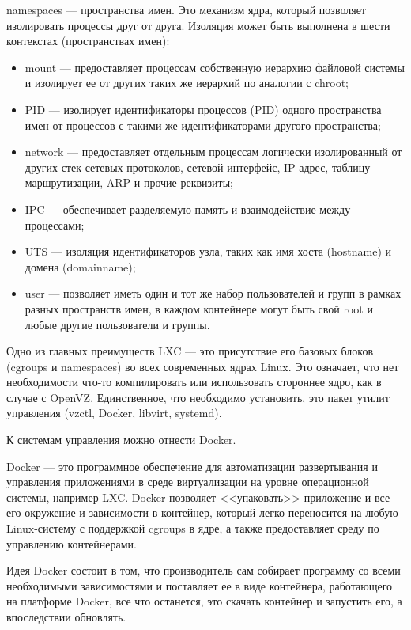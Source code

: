 namespaces --- пространства имен.
Это механизм ядра, который позволяет изолировать процессы друг от друга.
Изоляция может быть выполнена в шести контекстах (пространствах имен):
\begin{itemize}
  \item mount --- предоставляет процессам собственную иерархию файловой системы и изолирует ее от других таких же иерархий по аналогии с chroot;
  \item PID --- изолирует идентификаторы процессов (PID) одного пространства имен от процессов с такими же идентификаторами другого пространства;
  \item network --- предоставляет отдельным процессам логически изолированный от других стек сетевых протоколов, сетевой интерфейс, IP-адрес, таблицу маршрутизации, ARP и прочие реквизиты;
  \item IPC --- обеспечивает разделяемую память и взаимодействие между процессами;
  \item UTS --- изоляция идентификаторов узла, таких как имя хоста (hostname) и домена (domainname);
  \item user --- позволяет иметь один и тот же набор пользователей и групп в рамках разных пространств имен, в каждом контейнере могут быть свой root и любые другие пользователи и группы.
\end{itemize}

Одно из главных преимуществ LXC --- это присутствие его базовых блоков (cgroups и namespaces) во всех современных ядрах Linux.
Это означает, что нет необходимости что-то компилировать или использовать стороннее ядро, как в случае с OpenVZ.
Единственное, что необходимо установить, это пакет утилит управления (vzctl, Docker, libvirt, systemd).

К системам управления можно отнести Docker.

Docker --- это программное обеспечение для автоматизации развертывания и управления приложениями в среде виртуализации на уровне операционной системы, например LXC.
Docker позволяет <<упаковать>> приложение и все его окружение и зависимости в контейнер, который легко переносится на любую Linux-систему с поддержкой cgroups в ядре, а также предоставляет среду по управлению контейнерами.

Идея Docker состоит в том, что производитель сам собирает программу со всеми необходимыми зависимостями и поставляет ее в виде контейнера, работающего на платформе Docker, все что останется, это скачать контейнер и запустить его, а впоследствии обновлять.

